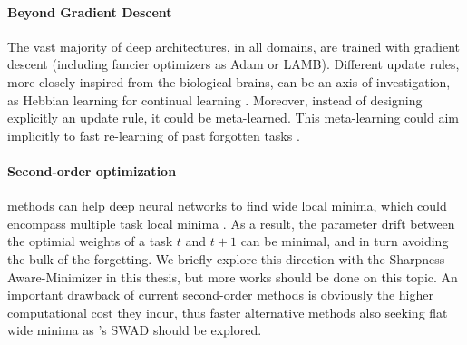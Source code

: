 \paragraph{Beyond Gradient Descent} The vast majority of deep architectures, in all domains, are
trained with gradient descent (including fancier optimizers as Adam or LAMB). Different update
rules, more closely inspired from the biological brains, can be an axis of investigation, as Hebbian
learning for continual learning \citep{taylor2020hebbiancontinual}. Moreover, instead of designing
explicitly an update rule, it could be meta-learned. This meta-learning could aim implicitly to
fast re-learning of past forgotten tasks \citep{he2019metacontinual,caccia2020osaka}.


\paragraph{Second-order optimization} methods can help deep neural networks to find wide local
minima, which could encompass multiple task local minima \citep{lee2020kroneckercontinual}. As a
result, the parameter drift between the optimial weights of a task $t$ and $t+1$ can be minimal, and
in turn avoiding the bulk of the forgetting. We briefly explore this direction with the
Sharpness-Aware-Minimizer \citep{foret2020sam} in this thesis, but more works should be done on this
topic. An important drawback of current second-order methods is obviously the higher computational
cost they incur, thus faster alternative methods also seeking flat wide minima as
\citet{cha2021swad}'s SWAD should be explored.

